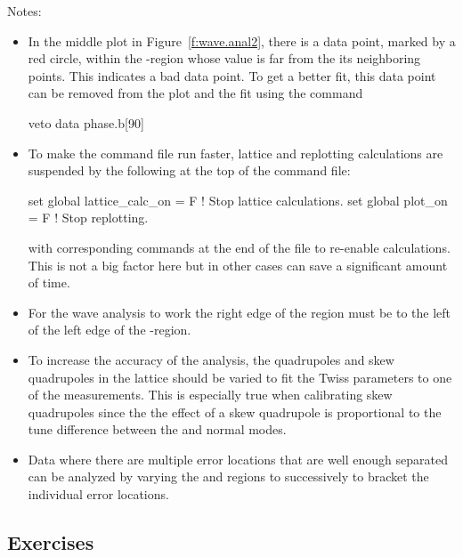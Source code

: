 \documentclass{hitec}     %
\begin{document}
Notes:
\vspace{-5 pt}
\begin{itemize}
\item
In the middle plot in Figure~\ref{f:wave.anal2}, there is a data point, marked by a red circle,
within the -region whose value is far from the its neighboring points. This indicates a bad
data point. To get a better fit, this data point can be removed from the plot and the fit using the
command
\begin{code}
veto data phase.b[90]
\end{code}
%
\item
To make the  command file run faster, lattice and replotting calculations are
suspended by the following at the top of the command file:
\begin{code}
set global lattice_calc_on = F   ! Stop lattice calculations. 
set global plot_on = F           ! Stop replotting.
\end{code}
with corresponding commands at the end of the file to re-enable calculations. This is not a big
factor here but in other cases can save a significant amount of time.
%
\item
For the wave analysis to work the right edge of the  region must be to the left of the left
edge of the -region.
%
\item
To increase the accuracy of the analysis, the quadrupoles and skew quadrupoles in the
lattice should be varied to fit the  Twiss parameters to one of the measurements. This
is especially true when calibrating skew quadrupoles since the the effect of a skew quadrupole is 
proportional to the tune difference between the  and  normal modes.
%
\item
Data where there are multiple error locations that are well enough separated can be analyzed by
varying the  and  regions to successively to bracket the individual error locations.
\end{itemize}

\subsection{Exercises}
\label{s:wave.ex}
\end{document}
